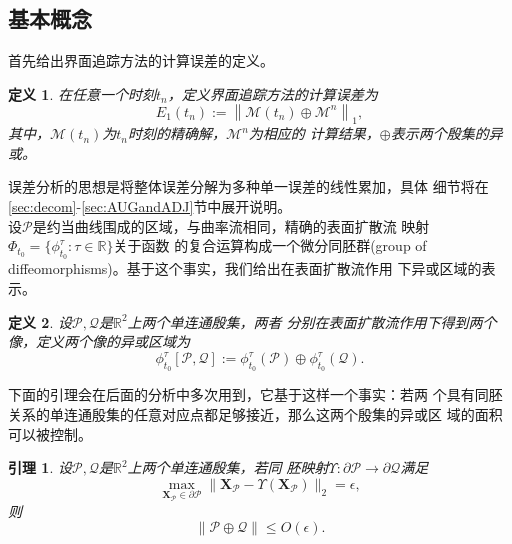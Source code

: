 \documentclass[a4paper,twoside]{ctexart}
\newtheorem{lemma}[theorem]{引理}
\newtheorem{definition}{定义}[section]
\begin{document}
  \subsection{基本概念}
  首先给出界面追踪方法的计算误差的定义。
  \begin{definition}
  在任意一个时刻$t_n$，定义界面追踪方法的计算误差为
  \begin{equation}
    \label{eq:defError}
    E_1(t_n) := \left \| \mathcal{M}(t_n) \oplus \mathcal{M}^n \right \|_1, 
  \end{equation}
  其中，$\mathcal{M}(t_n)$为$t_n$时刻的精确解，$\mathcal{M}^n$为相应的
  计算结果，$\oplus$表示两个殷集的异或。
  \end{definition}
  \indent 误差分析的思想是将整体误差分解为多种单一误差的线性累加，具体
  细节将在\ref{sec:decom}-\ref{sec:AUGandADJ}节中展开说明。\\
  \indent 设$\mathcal{P}$是约当曲线围成的区域，与曲率流相同，精确的表面扩散流
  映射$\Phi_{t_0} = \{\phi_{t_0}^\tau : \tau \in \mathbb{R}\}$关于函数
  的复合运算构成一个微分同胚群(group of diffeomorphisms)。基于这个事实，我们给出在表面扩散流作用
  下异或区域的表示。
  \begin{definition}
    设$\mathcal{P},\mathcal{Q}$是$\mathbb{R}^2$上两个单连通殷集，两者
    分别在表面扩散流作用下得到两个像，定义两个像的异或区域为
    \begin{equation}
      \label{eq:Xorimage}
      \phi_{t_0}^\tau[\mathcal{P},\mathcal{Q}] :=
      \phi_{t_0}^\tau(\mathcal{P}) \oplus \phi_{t_0}^\tau(\mathcal{Q}).
    \end{equation}
  \end{definition}
  \indent 下面的引理会在后面的分析中多次用到，它基于这样一个事实：若两
  个具有同胚关系的单连通殷集的任意对应点都足够接近，那么这两个殷集的异或区
  域的面积可以被控制。
  \begin{lemma}
    \label{le:1}
    设$\mathcal{P},\mathcal{Q}$是$\mathbb{R}^2$上两个单连通殷集，若同
    胚映射$\Upsilon:\partial \mathcal{P} \to \partial \mathcal{Q}$满足
    \begin{equation}
      \label{eq:homecond}
      \max_{\boldsymbol X_{\mathcal{P}}\in \partial
        \mathcal{P}}\|\boldsymbol X_{\mathcal{P}} -
        \Upsilon(\boldsymbol X_{\mathcal{P}}) \|_2 = \epsilon,
      \end{equation}
      则
      \begin{equation}
        \label{eq:le1}
        \|\mathcal{P} \oplus \mathcal{Q} \| \le O(\epsilon).
      \end{equation}
    \end{lemma}
\end{document}
